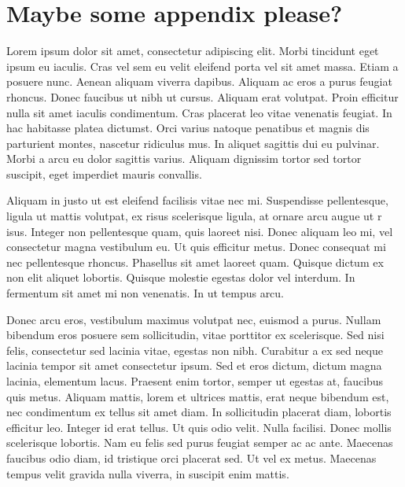 \documentclass[openany]{book}
\begin{document}
\appendix
\chapter{Maybe some appendix please?}
Lorem ipsum dolor sit amet, consectetur adipiscing elit. Morbi tincidunt eget 
ipsum eu iaculis. Cras vel sem eu velit eleifend porta vel sit amet massa. Etiam 
a posuere nunc. Aenean aliquam viverra dapibus. Aliquam ac eros a purus feugiat 
rhoncus. Donec faucibus ut nibh ut cursus. Aliquam erat volutpat. Proin efficitur 
nulla sit amet iaculis condimentum. Cras placerat leo vitae venenatis feugiat. In 
hac habitasse platea dictumst. Orci varius natoque penatibus et magnis dis 
parturient montes, nascetur ridiculus mus. In aliquet sagittis dui eu pulvinar. 
Morbi a arcu eu dolor sagittis varius. Aliquam dignissim tortor sed tortor 
suscipit, eget imperdiet mauris convallis.

Aliquam in justo ut est eleifend facilisis vitae nec mi. Suspendisse pellentesque, 
ligula ut mattis volutpat, ex risus scelerisque ligula, at ornare arcu augue ut r
isus. Integer non pellentesque quam, quis laoreet nisi. Donec aliquam leo mi, vel 
consectetur magna vestibulum eu. Ut quis efficitur metus. Donec consequat mi nec 
pellentesque rhoncus. Phasellus sit amet laoreet quam. Quisque dictum ex non elit 
aliquet lobortis. Quisque molestie egestas dolor vel interdum. In fermentum sit 
amet mi non venenatis. In ut tempus arcu.

Donec arcu eros, vestibulum maximus volutpat nec, euismod a purus. Nullam bibendum 
eros posuere sem sollicitudin, vitae porttitor ex scelerisque. Sed nisi felis, 
consectetur sed lacinia vitae, egestas non nibh. Curabitur a ex sed neque lacinia 
tempor sit amet consectetur ipsum. Sed et eros dictum, dictum magna lacinia, 
elementum lacus. Praesent enim tortor, semper ut egestas at, faucibus quis metus. 
Aliquam mattis, lorem et ultrices mattis, erat neque bibendum est, nec condimentum 
ex tellus sit amet diam. In sollicitudin placerat diam, lobortis efficitur leo. 
Integer id erat tellus. Ut quis odio velit. Nulla facilisi. Donec mollis 
scelerisque lobortis. Nam eu felis sed purus feugiat semper ac ac ante. Maecenas 
faucibus odio diam, id tristique orci placerat sed. Ut vel ex metus. Maecenas 
tempus velit gravida nulla viverra, in suscipit enim mattis.
\end{document}
